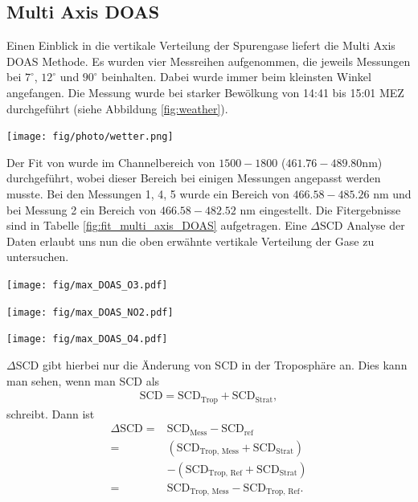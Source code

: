 \documentclass[12pt, a4paper, bibliography=totoc]{scrartcl}
\begin{document}
\begin{multicols}{2}
\subsection{Multi Axis DOAS}\label{ssec:multi_axis_DOAS}

Einen Einblick in die vertikale Verteilung der Spurengase liefert die Multi Axis DOAS Methode.
Es wurden vier Messreihen aufgenommen, die jeweils Messungen bei $7^\circ$, $12^\circ$ und $90^\circ$ beinhalten. 
Dabei wurde immer beim kleinsten Winkel angefangen.
Die Messung wurde bei starker Bewölkung von 14:41 bis 15:01 MEZ durchgeführt (siehe Abbildung \ref{fig:weather}).

\begin{center}
	\texttt{[image: fig/photo/wetter.png]}
	\label{fig:weather}
\end{center} 

Der Fit von  wurde im Channelbereich von $1500-1800$ ($461.76 - 489.80$\si{nm}) durchgeführt, wobei dieser Bereich bei einigen Messungen angepasst werden musste. 
Bei den Messungen 1, 4, 5 wurde ein Bereich von $466.58 - 485.26$ \si{nm} und bei Messung 2 ein Bereich von $466.58 - 482.52$ \si{nm} eingestellt.
Die Fitergebnisse sind in Tabelle \ref{fig:fit_multi_axis_DOAS} aufgetragen.
Eine $\Delta \text{SCD}$ Analyse der Daten erlaubt uns nun die oben erwähnte vertikale Verteilung der Gase zu untersuchen.

\begin{center}
	\texttt{[image: fig/max\_DOAS\_O3.pdf]}
	\label{fig:max_doas_o3}
\end{center}

\begin{center}
	\texttt{[image: fig/max\_DOAS\_NO2.pdf]}
	\label{fig:max_doas_no2}
\end{center}

\begin{center}
	\texttt{[image: fig/max\_DOAS\_O4.pdf]}
	\label{fig:max_doas_o4}
\end{center}

$\Delta$SCD gibt hierbei nur die Änderung von SCD in der Troposphäre an.
Dies kann man sehen, wenn man SCD als
\begin{align}
    \text{SCD} = \text{SCD}_\text{Trop} + \text{SCD}_\text{Strat},
\end{align}
schreibt.
Dann ist 
\begin{align}
\Delta\text{SCD} =& \text{SCD}_{\text{Mess}} - \text{SCD}_\text{ref} \\
    =& (\text{SCD}_{\text{Trop, \ Mess}} + \text{SCD}_{\text{Strat}}) \\
    & - (\text{SCD}_{\text{Trop, \ Ref}} + \text{SCD}_{\text{Strat}}) \\
    =& \text{SCD}_{\text{Trop, \ Mess}} - \text{SCD}_{\text{Trop, \ Ref}}. \label{eq:SCD_trop}
\end{align}


\end{multicols}
\end{document}
